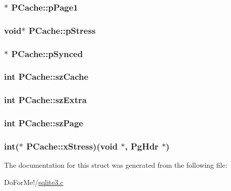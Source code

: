 \hypertarget{struct_p_cache_a190ece57aafde4310e424f82998776cb}{
\subsubsection[{p\-Page1}]{$\ast$ P\-Cache\-::p\-Page1}}\label{struct_p_cache_a190ece57aafde4310e424f82998776cb}
\hypertarget{struct_p_cache_af04a2ea8a2c6d6b3eea7bb7051b8f447}{
\subsubsection[{p\-Stress}]{\setlength{\rightskip}{0pt plus 5cm}void$\ast$ P\-Cache\-::p\-Stress}}\label{struct_p_cache_af04a2ea8a2c6d6b3eea7bb7051b8f447}
\hypertarget{struct_p_cache_a607eabd6768dd8df47d8fa353542b106}{
\subsubsection[{p\-Synced}]{$\ast$ P\-Cache\-::p\-Synced}}\label{struct_p_cache_a607eabd6768dd8df47d8fa353542b106}
\hypertarget{struct_p_cache_a93ed4b9d731d883c3ed22a5adfd9c636}{
\subsubsection[{sz\-Cache}]{\setlength{\rightskip}{0pt plus 5cm}int P\-Cache\-::sz\-Cache}}\label{struct_p_cache_a93ed4b9d731d883c3ed22a5adfd9c636}
\hypertarget{struct_p_cache_abcb37fcd3ea098b98a196a3f69e3c135}{
\subsubsection[{sz\-Extra}]{\setlength{\rightskip}{0pt plus 5cm}int P\-Cache\-::sz\-Extra}}\label{struct_p_cache_abcb37fcd3ea098b98a196a3f69e3c135}
\hypertarget{struct_p_cache_abb0bd0a3292780dcc07cb59bc577990d}{
\subsubsection[{sz\-Page}]{\setlength{\rightskip}{0pt plus 5cm}int P\-Cache\-::sz\-Page}}\label{struct_p_cache_abb0bd0a3292780dcc07cb59bc577990d}
\hypertarget{struct_p_cache_a8b177ebb03aaf4774b6137d48733eeb5}{
\subsubsection[{x\-Stress}]{\setlength{\rightskip}{0pt plus 5cm}int($\ast$ P\-Cache\-::x\-Stress)(void $\ast$, {\bf Pg\-Hdr} $\ast$)}}\label{struct_p_cache_a8b177ebb03aaf4774b6137d48733eeb5}


The documentation for this struct was generated from the following file\-:\begin{DoxyCompactItemize}
\item 
Do\-For\-Me!/\hyperlink{sqlite3_8c}{sqlite3.\-c}\end{DoxyCompactItemize}
